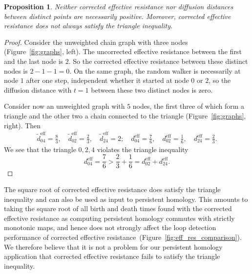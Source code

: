 \documentclass{article}
\theoremstyle{plain}
\newtheorem{proposition}[theorem]{Proposition}
\theoremstyle{definition}
\theoremstyle{remark}
\begin{document}
\begin{proposition}\label{prop:corr_eff_res_not_metric}
    Neither corrected effective resistance nor diffusion distances between distinct points are necessarily positive. Moreover, corrected effective resistance does not always satisfy the triangle inequality.
\end{proposition}
\begin{proof}
    Consider the unweighted chain graph with three nodes (Figure~\ref{fig:graphs}, left). The uncorrected effective resistance between the first and the last node is $2$. So the corrected effective resistance between these distinct nodes is $2- 1- 1= 0$. On the same graph, the random walker is necessarily at node $1$ after one step, independent whether it started at node $0$ or $2$, so the diffusion distance with $t=1$ between these two distinct nodes is zero.

    Consider now an unweighted graph with $5$ nodes, the first three of which form a triangle and the other two a chain connected to the triangle (Figure~\ref{fig:graphs}, right). Then
    \begin{align}
        \tilde{d}_{04}^\text{eff} =  \frac{8}{3}, \quad \tilde{d}_{02}^\text{eff} = \frac{2}{3}, \quad
        \tilde{d}_{24}^\text{eff}  = 2; \quad d_{04}^\text{eff}= \frac{7}{6}, \quad
        {d}_{02}^\text{eff}  = \frac{1}{6}, \quad d_{24}^\text{eff} =\frac{2}{3}.
    \end{align}
    We see that the triangle $0, 2, 4$ violates the triangle inequality
    $$d_{04}^\text{eff} =\frac{7}{6} > \frac{2}{3} + \frac{1}{6} = d_{02}^\text{eff}+ d_{24}^\text{eff}.$$
\end{proof}

The square root of corrected effective resistance does satisfy the triangle inequality and can also be used as input to persistent homology. This amounts to taking the square root of all birth and death times found with the corrected effective resistance as computing persistent homology commutes with strictly monotonic maps, and hence does not strongly affect the loop detection performance of corrected effective resistance~(Figure~\ref{fig:eff_res_comparison}). We therefore believe that it is not a problem for our persistent homology application that corrected effective resistance fails to satisfy the triangle inequality.
\end{document}
